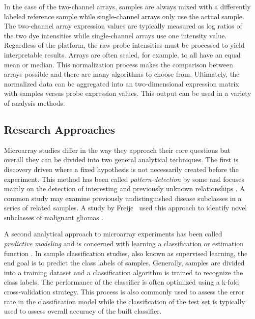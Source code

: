 In the case of the two-channel arrays, samples are always mixed with a
differently labeled reference sample while single-channel arrays only use the
actual sample.  The two-channel array expression values are typically
measured as log ratios of the two dye intensities while single-channel arrays use
 one intensity value. Regardless of the platform, the raw probe intensities
must be processed to yield interpretable results.  Arrays are often scaled, for
example, to all have an equal mean or median.  This normalization process makes
the comparison between arrays possible and there are many algorithms to choose
from.  Ultimately, the normalized data can be aggregated into an
two-dimensional expression matrix with samples versus probe expression values.
This output can be used in a variety of analysis methods.



\subsection{Research Approaches}

Microarray studies differ in the way they approach their core questions but
overall they can be divided into two general analytical techniques.  The first
is discovery driven where a fixed hypothesis is not necessarily created before
the experiment.  This method has been called \emph{pattern-detection} by
some and focuses mainly on the detection of interesting and previously unknown
relationships \cite{Dubitzky2003IMD}.  A common study may examine previously
undistinguished disease subclasses in a series of related samples.  A study by
Freije \ea\ used this approach to identify novel subclasses of malignant
gliomas \cite{PMID_15374961}. 

A second analytical approach to microarray experiments has been called
\emph{predictive modeling} and is concerned with learning a classification or
estimation function \cite{Dubitzky2003IMD}. In sample classification studies, also
known as supervised learning, the end goal is to predict the class labels of
samples. Generally, samples are divided into a training dataset and a
classification algorithm is trained to recognize the class labels. The
performance of the classifier is often optimized using a k-fold
cross-validation strategy.  This process is also commonly used to assess the
error rate in the classification model while the classification of the test set
is typically used to assess overall accuracy of the built classifier.

